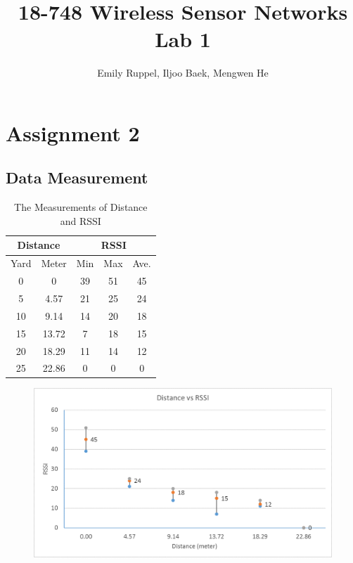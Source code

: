 \documentclass[letterpaper, 12pt]{article}
\title{\textbf{18-748 Wireless Sensor Networks Lab 1}}
\author{Emily Ruppel, Iljoo Baek, Mengwen He}
\begin{document}
\maketitle
	
\section{Assignment 2}

\subsection{Data Measurement}

\begin{table}[!h]
	\centering
	\caption{The Measurements of Distance and RSSI}
	\begin{tabular}{|c|c|c|c|c|}
		\hline
		\multicolumn{2}{|c|}{Distance} & \multicolumn{3}{|c|}{RSSI} \\
		\hline
		Yard	&	Meter	&	Min	&	Max	&	Ave.\\
		\hline
		0		&	0		&	39	&	51	&	45	\\
		\hline
		5		&	4.57	&	21	&	25	&	24	\\
		\hline
		10		&	9.14	&	14	&	20	&	18	\\
		\hline
		15		&	13.72	&	7	&	18	&	15	\\
		\hline
		20		&	18.29	&	11	&	14	&	12	\\
		\hline
		25		&	22.86	&	0	&	0	&	0	\\
		\hline
	\end{tabular}
\end{table}

\begin{figure}[!h]
	\centering
	\includegraphics[width=15cm]{./img/data.png}
\end{figure}
\end{document}
